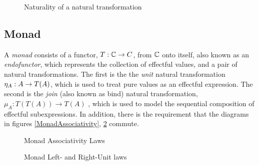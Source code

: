 \documentclass{Report}
\begin{document}
\begin{figure}
    \centering
    \begin{minipage}{0.45\textwidth}
        \centering
        \begin{framed}
    \end{framed}
        \caption{Naturality of a natural transformation}
        \label{Naturality}
    \end{minipage}\hfill
\end{figure}



\subsection{Monad}
A \textit{monad} consists of a functor, $T: \mathbb{C} \rightarrow C$, from $\mathbb{C}$ onto itself, also known as an \textit{endofunctor}, which represents the collection of effectful values, and a pair of natural transformations. The first is the the \textit{unit} natural transformation $\eta_{A}: A\rightarrow T(A)$, which is used to treat pure values as an effectful expression. The second is the \textit{join} (also known as bind) natural transformation, $\mu_{A}: T(T(A)) \rightarrow T(A)$ ,  which is used to model the sequential composition of effectful subexpressions. In addition, there is the requirement that the diagrams in figures \ref{MonadAssociativity}, \ref{MonadUnits} commute.


\begin{figure}
\begin{framed}  
        \centering
        \begin{minipage}{0.45\textwidth}
            \centering
            \caption{Monad Associativity Laws}
            \label{MonadAssociativity}
        \end{minipage}\hfill
        \begin{minipage}{0.45\textwidth}
            \centering
            \caption{Monad Left- and Right-Unit laws}
            \label{MonadUnits}
        \end{minipage}
\end{framed}
\end{figure}
\end{document}
